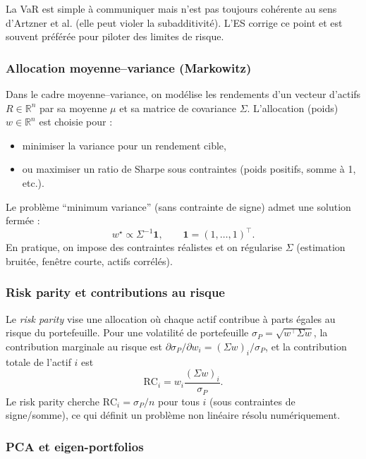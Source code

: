 \documentclass[11pt,a4paper]{article}
\newcommand{\1}{\mathbf{1}}
\begin{document}
La VaR est simple \`a communiquer mais n'est pas toujours coh\'erente au sens d'Artzner et al. (elle peut violer la
subadditivit\'e). L'ES corrige ce point et est souvent pr\'ef\'er\'ee pour piloter des limites de risque.

\subsubsection{Allocation moyenne--variance (Markowitz)}

Dans le cadre moyenne--variance, on mod\'elise les rendements d'un vecteur d'actifs $R\in\mathbb{R}^n$ par sa moyenne
$\mu$ et sa matrice de covariance $\Sigma$. L'allocation (poids) $w\in\mathbb{R}^n$ est choisie pour :
\begin{itemize}
  \item minimiser la variance pour un rendement cible,
  \item ou maximiser un ratio de Sharpe sous contraintes (poids positifs, somme \`a 1, etc.).
\end{itemize}

Le probl\`eme ``minimum variance'' (sans contrainte de signe) admet une solution ferm\'ee :
\[
w^\star \propto \Sigma^{-1}\mathbf{1},\qquad
\mathbf{1}=(1,\dots,1)^\top.
\]
En pratique, on impose des contraintes r\'ealistes et on r\'egularise $\Sigma$ (estimation bruit\'ee, fen\^etre courte,
actifs corr\'el\'es).

\subsubsection{Risk parity et contributions au risque}

Le \emph{risk parity} vise une allocation o\`u chaque actif contribue \`a parts \'egales au risque du portefeuille.
Pour une volatilité de portefeuille $\sigma_P=\sqrt{w^\top\Sigma w}$, la contribution marginale au risque est
$\partial\sigma_P/\partial w_i = (\Sigma w)_i/\sigma_P$, et la contribution totale de l'actif $i$ est
\[
\mathrm{RC}_i = w_i \frac{(\Sigma w)_i}{\sigma_P}.
\]
Le risk parity cherche $\mathrm{RC}_i=\sigma_P/n$ pour tous $i$ (sous contraintes de signe/somme), ce qui d\'efinit un
probl\`eme non lin\'eaire r\'esolu num\'eriquement.

\subsubsection{PCA et eigen-portfolios}
\end{document}
